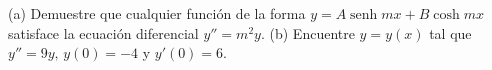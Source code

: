 \item (a) Demuestre que cualquier función de la forma $y = A \operatorname{senh} mx + B \cosh mx$ satisface la ecuación diferencial $y'' = m^2y$.
    (b) Encuentre $y = y(x)$ tal que $y'' = 9y, \, y(0) = -4$ y $y'(0) = 6$.
